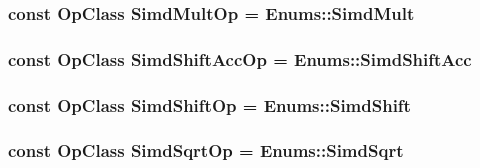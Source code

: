 \label{op__class_8hh_a4c479e9bffd76c1d55b04744fe786e66}
\hypertarget{op__class_8hh_a9d11ad4c2cae79af98ff46cdfc575b18}{
\subsubsection[{SimdMultOp}]{\setlength{\rightskip}{0pt plus 5cm}const OpClass {\bf SimdMultOp} = Enums::SimdMult}}
\label{op__class_8hh_a9d11ad4c2cae79af98ff46cdfc575b18}
\hypertarget{op__class_8hh_a64f736357e43435fbf25e0d442609800}{
\subsubsection[{SimdShiftAccOp}]{\setlength{\rightskip}{0pt plus 5cm}const OpClass {\bf SimdShiftAccOp} = Enums::SimdShiftAcc}}
\label{op__class_8hh_a64f736357e43435fbf25e0d442609800}
\hypertarget{op__class_8hh_a0789375948983a38d919a22cb3c82d7e}{
\subsubsection[{SimdShiftOp}]{\setlength{\rightskip}{0pt plus 5cm}const OpClass {\bf SimdShiftOp} = Enums::SimdShift}}
\label{op__class_8hh_a0789375948983a38d919a22cb3c82d7e}
\hypertarget{op__class_8hh_aa24fd42b50aa2f1c06226e51310c4a0c}{
\subsubsection[{SimdSqrtOp}]{\setlength{\rightskip}{0pt plus 5cm}const OpClass {\bf SimdSqrtOp} = Enums::SimdSqrt}}
\label{op__class_8hh_aa24fd42b50aa2f1c06226e51310c4a0c}
